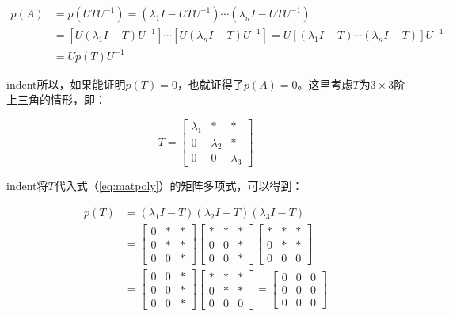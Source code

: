 \documentclass[UTF8,nofonts]{ctexart}
\begin{document}
\begin{align*}
p(A)&=p(UTU^{-1})=\left(\lambda_1I-UTU^{-1}\right)\cdots\left(\lambda_nI-UTU^{-1}\right) \\
&=\left[U(\lambda_1I-T)U^{-1}\right]\cdots\left[U(\lambda_nI-T)U^{-1}\right]=U\left[(\lambda_1I-T)\cdots(\lambda_nI-T)\right]U^{-1} \\
&=Up(T)U^{-1}
\end{align*}

indent所以，如果能证明$p(T)=0$，也就证得了$p(A)=0$。这里考虑$T$为$3 \times 3$阶上三角的情形，即：

\[
T=\begin{bmatrix}
\lambda_1 & \ast & \ast \\
0 & \lambda_2 & \ast \\
0 & 0 & \lambda_3
\end{bmatrix}
\]

indent将$T$代入式（\ref{eq:matpoly}）的矩阵多项式，可以得到：

\begin{align*}
p(T) &= (\lambda_1I-T)(\lambda_2I-T)(\lambda_3I-T) \\
&=
\begin{bmatrix}0 &\ast & \ast \\ 0 & \ast & \ast \\ 0 & 0 & \ast\end{bmatrix}
\begin{bmatrix}\ast & \ast & \ast \\ 0 & 0 & \ast \\ 0 & 0 & \ast\end{bmatrix}
\begin{bmatrix}\ast & \ast & \ast \\ 0 & \ast & \ast \\ 0 & 0 & 0\end{bmatrix} \\
&=
\begin{bmatrix}0 & 0 & \ast \\ 0 & 0 & \ast \\ 0 & 0 & \ast \end{bmatrix}
\begin{bmatrix}\ast & \ast & \ast \\ 0 & \ast & \ast \\ 0 & 0 & 0\end{bmatrix}
=\begin{bmatrix}0 & 0 & 0 \\ 0 & 0 & 0 \\ 0 & 0 & 0 \end{bmatrix}
\end{align*}
\end{document}
